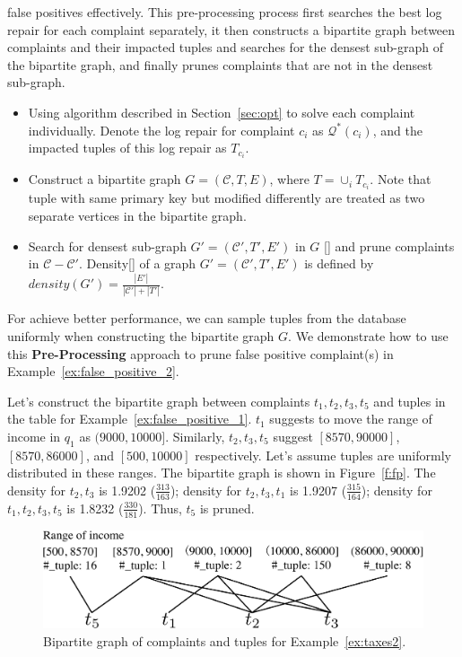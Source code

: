   false positives effectively. This pre-processing process first searches the 
  best log repair for each complaint separately, it then constructs 
  a bipartite graph between complaints and their impacted tuples and
  searches for the densest sub-graph of the bipartite graph, and finally 
  prunes complaints that are not in the densest sub-graph.
  \begin{itemize}
  \item Using algorithm described in Section~\ref{sec:opt} to solve each 
  complaint individually. Denote the log repair for complaint $c_i$ 
  as $\mathcal{Q}^*(c_i)$, and the impacted tuples of this log repair as
  $T_{c_i}$.
  \item Construct a bipartite graph $G = (\mathcal{C}, T, E)$, where 
  $T = \cup_{i} T_{c_i}$. Note that tuple with same primary key but modified 
  differently are treated as two separate vertices in the bipartite graph. 
  \item Search for densest sub-graph $G' = (\mathcal{C}', T', E')$ in $G$ 
  []  and prune complaints in $\mathcal{C} - \mathcal{C}'$. 
  Density[] of a graph $G' = (\mathcal{C}', T', E')$
  is defined by $density(G') = \frac{|E'|}{|\mathcal{C}'|+|T'|}$. 
  \end{itemize}
  For achieve better performance, we can sample tuples
  from the database uniformly when constructing the bipartite graph $G$. 
  We demonstrate how to use this \textbf{Pre-Processing} 
  approach to prune false positive complaint(s) in Example~\ref{ex:false_positive_2}. 
  \begin{example}
  \label{ex:false_positive_2}
  Let's construct the bipartite graph between complaints $t_1, t_2, t_3, t_5$ 
  and tuples in the table for Example~\ref{ex:false_positive_1}. 
  $t_1$ suggests to move the range of income in $q_1$ 
  as $(9000, 10000]$. Similarly, $t_2, t_3, t_5$ suggest $[8570, 90000]$, 
  $[8570, 86000]$, and $[500, 10000]$ respectively. Let's assume tuples are
  uniformly distributed in these ranges. The bipartite graph is shown in 
  Figure~\ref{f:fp}. The density for $t_2, t_3$ is 1.9202 ($\frac{313}{163}$);
  density for $t_2, t_3, t_1$ is 1.9207 ($\frac{315}{164}$); density for 
  $t_1, t_2, t_3, t_5$ is 1.8232 ($\frac{330}{181}$). Thus, $t_5$ is pruned. 
  \begin{figure}[ht]
  \centering
  \includegraphics[width = 0.85\columnwidth]{figures/falsepositive_example}
  \caption{Bipartite graph of complaints and tuples for Example~\ref{ex:taxes2}. }
  \label{f:pf} 
  \end{figure}
  \end{example}

\fi
